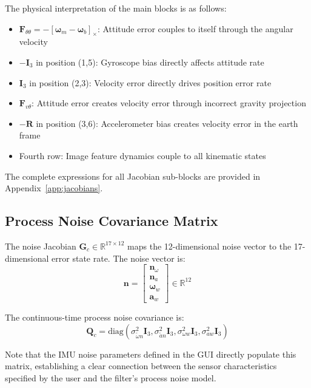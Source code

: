 \documentclass[11pt,a4paper]{article}
\newcommand{\bgyr}{\bm{\omega}_b}
\newcommand{\R}{\mathbf{R}}
\newcommand{\I}{\mathbf{I}}
\renewcommand{\skew}[1]{\left[#1\right]_\times}
\begin{document}
The physical interpretation of the main blocks is as follows:
\begin{itemize}
    \item $\mathbf{F}_{\theta\theta} = -\skew{\bm{\omega}_m - \bgyr}$: Attitude error couples to itself through the angular velocity
    \item $-\I_3$ in position (1,5): Gyroscope bias directly affects attitude rate
    \item $\I_3$ in position (2,3): Velocity error directly drives position error rate
    \item $\mathbf{F}_{v\theta}$: Attitude error creates velocity error through incorrect gravity projection
    \item $-\R$ in position (3,6): Accelerometer bias creates velocity error in the earth frame
    \item Fourth row: Image feature dynamics couple to all kinematic states
\end{itemize}

The complete expressions for all Jacobian sub-blocks are provided in Appendix~\ref{app:jacobians}.

\subsection{Process Noise Covariance Matrix}

The noise Jacobian $\mathbf{G}_c \in \mathbb{R}^{17 \times 12}$ maps the 12-dimensional noise vector to the 17-dimensional error state rate. The noise vector is:
\begin{equation}
    \mathbf{n} = \begin{bmatrix} \mathbf{n}_\omega \\ \mathbf{n}_a \\ \bm{\omega}_w \\ \mathbf{a}_w \end{bmatrix} \in \mathbb{R}^{12}
\end{equation}

The continuous-time process noise covariance is:
\begin{equation}
    \mathbf{Q}_c = \text{diag}\left(\sigma_{\tilde{\omega}n}^2 \I_3, \sigma_{\tilde{a}n}^2 \I_3, \sigma_{\omega w}^2 \I_3, \sigma_{aw}^2 \I_3\right)
\end{equation}

Note that the IMU noise parameters defined in the GUI directly populate this matrix, establishing a clear connection between the sensor characteristics specified by the user and the filter's process noise model.
\end{document}
